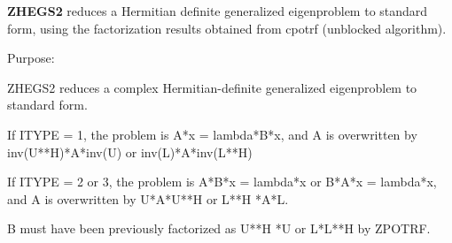 {\bfseries Z\+H\+E\+G\+S2} reduces a Hermitian definite generalized eigenproblem to standard form, using the factorization results obtained from cpotrf (unblocked algorithm). 

 \begin{DoxyParagraph}{Purpose\+: }
\begin{DoxyVerb} ZHEGS2 reduces a complex Hermitian-definite generalized
 eigenproblem to standard form.

 If ITYPE = 1, the problem is A*x = lambda*B*x,
 and A is overwritten by inv(U**H)*A*inv(U) or inv(L)*A*inv(L**H)

 If ITYPE = 2 or 3, the problem is A*B*x = lambda*x or
 B*A*x = lambda*x, and A is overwritten by U*A*U**H or L**H *A*L.

 B must have been previously factorized as U**H *U or L*L**H by ZPOTRF.\end{DoxyVerb}
 
\end{DoxyParagraph}

